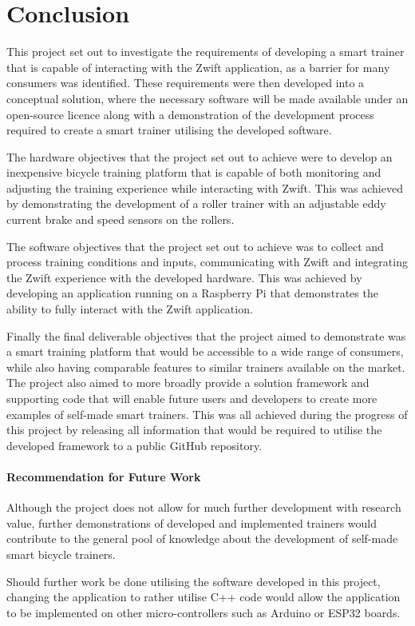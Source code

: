 \chapter{Conclusion}
\label{ch:conclusion}

This project set out to investigate the requirements of developing a smart trainer that is capable of interacting with the Zwift application, as a barrier for many consumers was identified. These requirements were then developed into a conceptual solution, where the necessary software will be made available under an open-source licence along with a demonstration of the development process required to create a smart trainer utilising the developed software.

The hardware objectives that the project set out to achieve were to develop an inexpensive bicycle training platform that is capable of both monitoring and adjusting the training experience while interacting with Zwift. This was achieved by demonstrating the development of a roller trainer with an adjustable eddy current brake and speed sensors on the rollers.

The software objectives that the project set out to achieve was to collect and process training conditions and inputs, communicating with Zwift and integrating the Zwift experience with the developed hardware. This was achieved by developing an application running on a Raspberry Pi that demonstrates the ability to fully interact with the Zwift application.

Finally the final deliverable objectives that the project aimed to demonstrate was a smart training platform that would be accessible to a wide range of consumers, while also having comparable features to similar trainers available on the market. \\

The project also aimed to more broadly provide a solution framework and supporting code that will enable future users and developers to create more examples of self-made smart trainers. This was all achieved during the progress of this project by releasing all information that would be required to utilise the developed framework to a public GitHub repository.

\subsubsection{Recommendation for Future Work}

Although the project does not allow for much further development with research value, further demonstrations of developed and implemented trainers would contribute to the general pool of knowledge about the development of self-made smart bicycle trainers.

Should further work be done utilising the software developed in this project, changing the application to rather utilise C++ code would allow the application to be implemented on other micro-controllers such as Arduino or ESP32 boards.